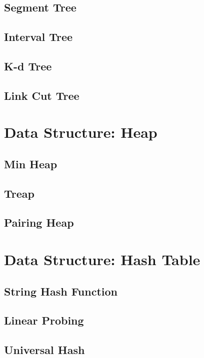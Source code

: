 \documentclass{article}
\begin{document}
    \subsection{Segment Tree}
        
    \subsection{Interval Tree}
    \subsection{K-d Tree}
        
    \subsection{Link Cut Tree}
        

\section{Data Structure: Heap}
    \subsection{Min Heap}

    \subsection{Treap}
        
    \subsection{Pairing Heap}

\section{Data Structure: Hash Table}
    \subsection{String Hash Function}
        
    \subsection{Linear Probing}
    \subsection{Universal Hash}
\end{document}
